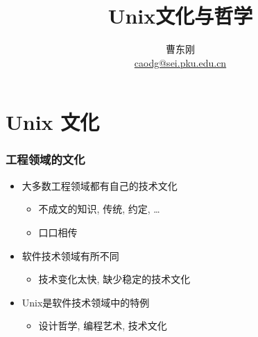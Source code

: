 \documentclass[compress]{beamer}
\begin{document}
					
\title{Unix文化与哲学}

\author[\href{http://c.pku.edu.cn/}{http://c.pku.edu.cn/}]
{曹东刚\\\href{mailto:caodg@sei.pku.edu.cn}{caodg@sei.pku.edu.cn}}


\date{}


\begin{frame}
	\titlepage
\end{frame}

\section{Unix 文化}

\begin{frame}
\frametitle{工程领域的文化 }
\begin{itemize}
    \item 大多数工程领域都有自己的技术文化
        \begin{itemize}
        \item 不成文的知识, 传统, 约定, \ldots
        \item 口口相传
        \end{itemize}
    \item 软件技术领域有所不同
        \begin{itemize}
        \item 技术变化太快, 缺少稳定的技术文化
        \end{itemize}
    \item Unix是软件技术领域中的特例
        \begin{itemize}
        \item  设计哲学, 编程艺术, 技术文化
        \end{itemize}
\end{itemize}

\end{frame}
\end{document}
